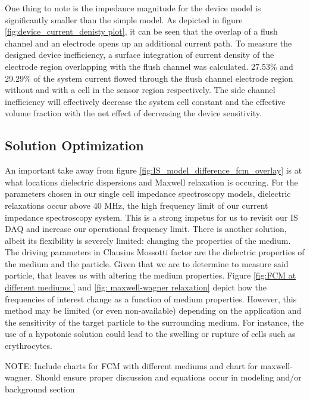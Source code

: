\par One thing to note is the impedance magnitude for the device model is significantly smaller than the simple model. As depicted in figure \ref{fig:device_current_denisty plot}, it can be seen that the overlap of a flush channel and an electrode opens up an additional current path. To measure the designed device inefficiency, a surface integration of current density of the electrode region overlapping with the flush channel was calculated. 27.53\% and 29.29\% of the system current flowed through the flush channel electrode region without and with a cell in the sensor region respectively. The side channel inefficiency will effectively decrease the system cell constant and the effective volume fraction with the net effect of decreasing the device sensitivity.

\FloatBarrier

\subsection{Solution Optimization}

\par An important take away from figure \ref{fig:IS_model_difference_fcm_overlay} is at what locations dielectric dispersions and Maxwell relaxation is occuring. For the parameters chosen in our single cell impedance spectroscopy models, dielectric relaxations occur above 40 MHz, the high frequency limit of our current impedance spectroscopy system. This is a strong impetus for us to revisit our IS DAQ and increase our operational frequency limit. There is another solution, albeit its flexibility is severely limited: changing the properties of the medium. The driving parameters in Clausius Mossotti factor are the dielectric properties of the medium and the particle. Given that we are to determine to measure said particle, that leaves us with altering the medium properties. Figure \ref{fig:FCM at different mediums } and \ref{fig: maxwell-wagner relaxation} depict how the frequencies of interest change as a function of medium properties. However, this method may be limited (or even non-available) depending on the application and the sensitivity of the target particle to the surrounding medium. For instance, the use of a hypotonic solution could lead to the swelling or rupture of cells such as erythrocytes.

\par NOTE: Include charts for FCM with different mediums and chart for maxwell-wagner. Should ensure proper discussion and equations occur in modeling and/or background section


